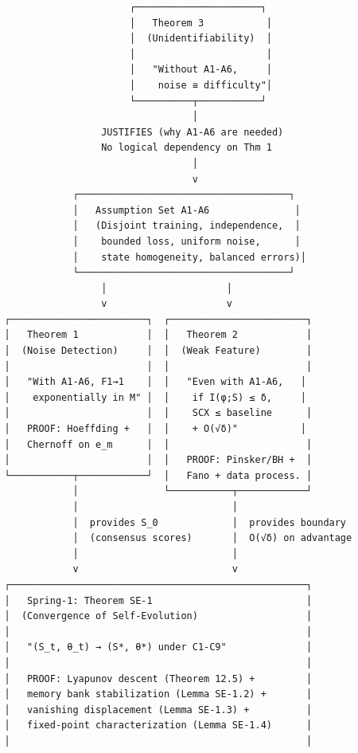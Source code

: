 \documentclass[
  12pt,
]{article}
\begin{document}
\begin{verbatim}
                         ┌──────────────────────┐
                         │   Theorem 3           │
                         │  (Unidentifiability)  │
                         │                       │
                         │   "Without A1-A6,     │
                         │    noise ≅ difficulty"│
                         └──────────┬───────────┘
                                    │
                    JUSTIFIES (why A1-A6 are needed)
                    No logical dependency on Thm 1
                                    │
                                    v
               ┌─────────────────────────────────────┐
               │   Assumption Set A1-A6               │
               │   (Disjoint training, independence,  │
               │    bounded loss, uniform noise,      │
               │    state homogeneity, balanced errors)│
               └─────────────────────────────────────┘
                    │                     │
                    v                     v
   ┌────────────────────────┐  ┌────────────────────────┐
   │   Theorem 1            │  │   Theorem 2            │
   │  (Noise Detection)     │  │  (Weak Feature)        │
   │                        │  │                        │
   │   "With A1-A6, F1→1    │  │   "Even with A1-A6,   │
   │    exponentially in M" │  │    if I(φ;S) ≤ δ,     │
   │                        │  │    SCX ≤ baseline      │
   │   PROOF: Hoeffding +   │  │    + O(√δ)"           │
   │   Chernoff on e_m      │  │                        │
   │                        │  │   PROOF: Pinsker/BH +  │
   └───────────┬────────────┘  │   Fano + data process. │
               │               └───────────┬────────────┘
               │                           │
               │  provides S_0             │  provides boundary
               │  (consensus scores)       │  O(√δ) on advantage
               │                           │
               v                           v
   ┌────────────────────────────────────────────────────┐
   │   Spring-1: Theorem SE-1                           │
   │  (Convergence of Self-Evolution)                   │
   │                                                    │
   │   "(S_t, θ_t) → (S*, θ*) under C1-C9"              │
   │                                                    │
   │   PROOF: Lyapunov descent (Theorem 12.5) +         │
   │   memory bank stabilization (Lemma SE-1.2) +       │
   │   vanishing displacement (Lemma SE-1.3) +          │
   │   fixed-point characterization (Lemma SE-1.4)      │
   │                                                    │

\end{verbatim}
\end{document}
